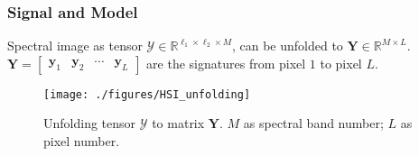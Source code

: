 \documentclass[10pt,mathserif]{beamer}
\newcommand{\R}{\mathbb R}
\begin{document}
    \begin{frame}
        \frametitle{Signal and Model}
        Spectral image as tensor $\bm{\mathcal Y} \in \R^{\ell_1 \times \ell_2 \times M}$,
        can be unfolded to $\bm Y \in \R^{M \times L}$.\\
        $\bm Y = \begin{bmatrix} \bm y_1 & \bm y_2 & \cdots & \bm y_L \end{bmatrix}$
        are the signatures from pixel $1$ to pixel $L$.
        \begin{figure}
            \texttt{[image: ./figures/HSI\_unfolding]}
            \caption{Unfolding tensor $\bm{\mathcal Y}$ to matrix $\bm Y$.
                     $M$ as spectral band number; $L$ as pixel number.}
        \end{figure}
    \end{frame}
\end{document}
